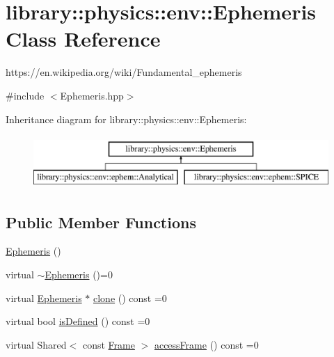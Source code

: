 \hypertarget{classlibrary_1_1physics_1_1env_1_1_ephemeris}{}\section{library\+:\+:physics\+:\+:env\+:\+:Ephemeris Class Reference}
\label{classlibrary_1_1physics_1_1env_1_1_ephemeris}


https\+://en.wikipedia.\+org/wiki/\+Fundamental\+\_\+ephemeris  




{\ttfamily \#include $<$Ephemeris.\+hpp$>$}

Inheritance diagram for library\+:\+:physics\+:\+:env\+:\+:Ephemeris\+:\begin{figure}[H]
\begin{center}
\leavevmode
\includegraphics[height=2.000000cm]{classlibrary_1_1physics_1_1env_1_1_ephemeris}
\end{center}
\end{figure}
\subsection*{Public Member Functions}
\begin{DoxyCompactItemize}
\item 
\hyperlink{classlibrary_1_1physics_1_1env_1_1_ephemeris_a99282f212b17cc6a4eb63f99e6b16f69}{Ephemeris} ()
\item 
virtual \hyperlink{classlibrary_1_1physics_1_1env_1_1_ephemeris_af2459c2cc219c926f18e540fd0ebbaac}{$\sim$\+Ephemeris} ()=0
\item 
virtual \hyperlink{classlibrary_1_1physics_1_1env_1_1_ephemeris}{Ephemeris} $\ast$ \hyperlink{classlibrary_1_1physics_1_1env_1_1_ephemeris_a7ddecd88d91f79ff204100eb9607b591}{clone} () const =0
\item 
virtual bool \hyperlink{classlibrary_1_1physics_1_1env_1_1_ephemeris_abf61a03e24dd146199381db14d1d7c68}{is\+Defined} () const =0
\item 
virtual Shared$<$ const \hyperlink{classlibrary_1_1physics_1_1coord_1_1_frame}{Frame} $>$ \hyperlink{classlibrary_1_1physics_1_1env_1_1_ephemeris_ac832f493239ace4d53c1c5130c1dad31}{access\+Frame} () const =0
\end{DoxyCompactItemize}


